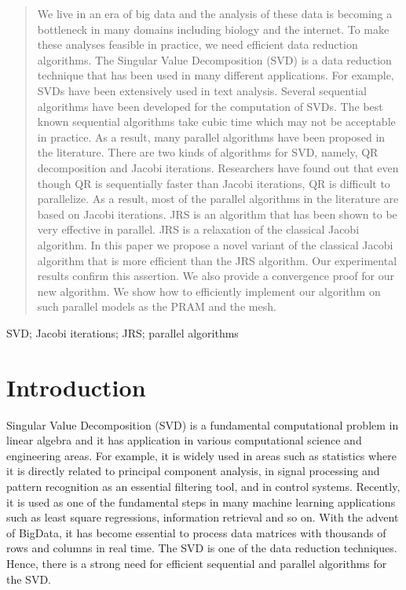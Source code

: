 \documentclass[10pt, conference, compsocconf]{IEEEtran}
\begin{document}
\begin{abstract}
We live in an era of big data and the analysis of these data is becoming a bottleneck in many domains including biology and the internet. To make these analyses feasible in practice, we need efficient data reduction algorithms. The Singular Value Decomposition (SVD) is a data reduction technique that has been used in many different applications. For example, SVDs have been extensively used in text analysis. Several sequential algorithms have been developed for the computation of SVDs. The best known sequential algorithms take cubic time which may not be acceptable in practice. As a result, many parallel algorithms have been proposed in the literature. There are two kinds of algorithms for SVD, namely, QR decomposition and Jacobi iterations. Researchers have found out that even though QR is sequentially faster than Jacobi iterations, QR is difficult to parallelize. As a result, most of the parallel algorithms in the literature are based on Jacobi iterations. JRS is an algorithm that has been shown to be very effective in parallel. JRS is a relaxation of the classical Jacobi algorithm. In this paper we propose a novel variant of the classical Jacobi algorithm that is more efficient than the JRS algorithm. Our experimental results confirm this assertion. We also provide a convergence proof for our new algorithm. We show how to efficiently implement our algorithm on such parallel models as the PRAM and the mesh. 
\end{abstract}

\begin{IEEEkeywords}
SVD; Jacobi iterations; JRS; parallel algorithms
\end{IEEEkeywords}


%
\IEEEpeerreviewmaketitle



\section{Introduction}
Singular Value Decomposition (SVD) is a fundamental computational problem in linear algebra and it has application in various computational science and engineering areas. For example, it is widely used in areas such as statistics where it is directly related to principal component analysis, in signal processing and pattern recognition as an essential filtering tool, and in control systems. Recently, it is used as one of the fundamental steps in many machine learning applications such as least square regressions, information retrieval and so on. With the advent of BigData, it has become essential to process data matrices with thousands of rows and columns in real time. The SVD is one of the data reduction techniques. Hence, there is a strong need for efficient sequential and parallel algorithms for the SVD.
\end{document}
